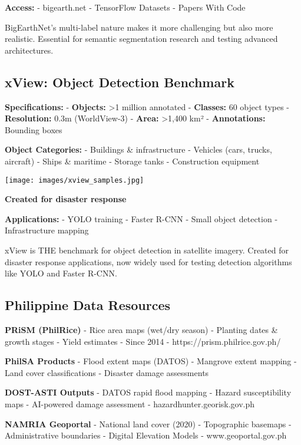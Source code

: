\documentclass[
  letterpaper,
  DIV=11,
  numbers=noendperiod]{scrartcl}
\begin{document}
\textbf{Access:} - bigearth.net - TensorFlow Datasets - Papers With Code

BigEarthNet's multi-label nature makes it more challenging but also more
realistic. Essential for semantic segmentation research and testing
advanced architectures.

\subsection{xView: Object Detection
Benchmark}\label{xview-object-detection-benchmark}

\textbf{Specifications:} - \textbf{Objects:} \textgreater1 million
annotated - \textbf{Classes:} 60 object types - \textbf{Resolution:}
0.3m (WorldView-3) - \textbf{Area:} \textgreater1,400 km² -
\textbf{Annotations:} Bounding boxes

\textbf{Object Categories:} - Buildings \& infrastructure - Vehicles
(cars, trucks, aircraft) - Ships \& maritime - Storage tanks -
Construction equipment

\texttt{[image: images/xview\_samples.jpg]}

\textbf{Created for disaster response}

\textbf{Applications:} - YOLO training - Faster R-CNN - Small object
detection - Infrastructure mapping

xView is THE benchmark for object detection in satellite imagery.
Created for disaster response applications, now widely used for testing
detection algorithms like YOLO and Faster R-CNN.

\subsection{Philippine Data Resources}\label{philippine-data-resources}

\textbf{PRiSM (PhilRice)} - Rice area maps (wet/dry season) - Planting
dates \& growth stages - Yield estimates - Since 2014 -
https://prism.philrice.gov.ph/

\textbf{PhilSA Products} - Flood extent maps (DATOS) - Mangrove extent
mapping - Land cover classifications - Disaster damage assessments

\textbf{DOST-ASTI Outputs} - DATOS rapid flood mapping - Hazard
susceptibility maps - AI-powered damage assessment -
hazardhunter.georisk.gov.ph

\textbf{NAMRIA Geoportal} - National land cover (2020) - Topographic
basemaps - Administrative boundaries - Digital Elevation Models -
www.geoportal.gov.ph
\end{document}
